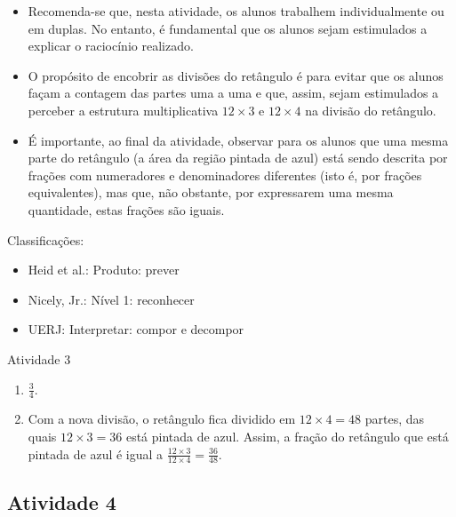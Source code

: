 \documentclass[oneside]{book}
\begin{document}
\begin{multicols}{2}
  
 
\begin{itemize} %
    \item       Recomenda-se que, nesta atividade, os alunos trabalhem 
individualmente ou em duplas. No entanto, é fundamental que os alunos sejam 
estimulados a explicar o raciocínio realizado.
    \item       O propósito de encobrir as divisões do retângulo é para evitar 
que os alunos façam a contagem das partes uma a uma e que, assim, sejam 
estimulados a perceber a estrutura multiplicativa       $12 \times 3$       e    
   $12 \times 4$       na divisão do retângulo.
    \item       É importante, ao final da atividade, observar para os alunos que 
uma mesma parte do retângulo (a área da região pintada de azul) está sendo 
descrita por frações com numeradores e denominadores diferentes (isto é, por 
frações equivalentes), mas que, não obstante, por expressarem uma mesma 
quantidade, estas frações são iguais. 
\end{itemize} %
  
  
  Classificações:  
\begin{itemize} %
    \item       Heid et al.: Produto: prever
    \item       Nicely, Jr.: Nível 1: reconhecer
    \item       UERJ: Interpretar: compor e decompor
\end{itemize} %
  
\begin{resposta*}{Atividade 3}  
\begin{enumerate} [\quad a)] %
    \item             $\frac{3}{4}$.
    \item       Com a nova divisão, o retângulo fica dividido em       $12 
\times 4 = 48$       partes, das quais       $12 \times 3 = 36$       está 
pintada de azul. Assim, a fração do retângulo que está pintada de azul é igual a 
      $\frac{12 \times 3}{12 \times 4} = \frac{36}{48}$.
\end{enumerate} %
  
\end{resposta*}



\subsection{Atividade 4}


\end{multicols}
\end{document}
